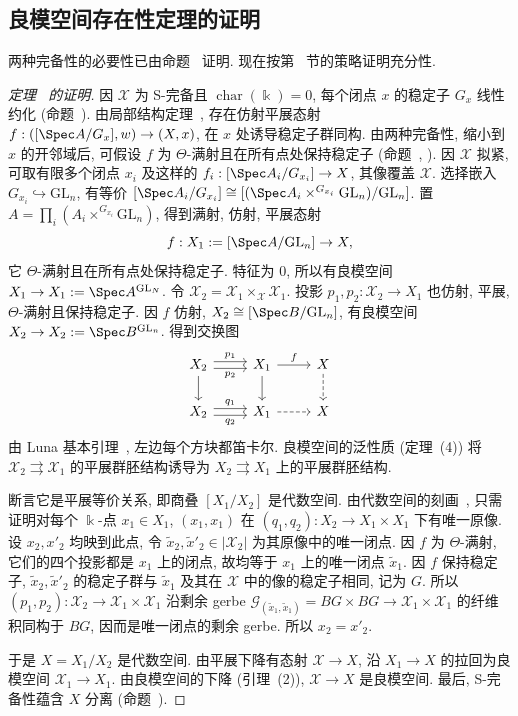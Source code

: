 \subsection{良模空间存在性定理的证明}\label{src:7.10.7-subsection}
两种完备性的必要性已由命题~ 证明. 现在按第~ 节的策略证明充分性.
\begin{proof}[定理~ 的证明]
因 $\mathcal X$ 为 S-完备且 $\operatorname{char}(\Bbbk)=0$, 每个闭点 $x$ 的稳定子 $G_x$ 线性约化 (命题~). 由局部结构定理~, 存在仿射平展态射 $f:([\Spec A/G_x],w)\to(\mathcal X,x)$, 在 $x$ 处诱导稳定子群同构. 由两种完备性, 缩小到 $x$ 的开邻域后, 可假设 $f$ 为 $\Theta$-满射且在所有点处保持稳定子 (命题~, ). 因 $\mathcal X$ 拟紧, 可取有限多个闭点 $x_i$ 及这样的 $f_i:[\Spec A_i/G_{x_i}]\to\mathcal X$, 其像覆盖 $\mathcal X$. 选择嵌入 $G_{x_i}\hookrightarrow\mathrm{GL}_n$, 有等价 $[\Spec A_i/G_{x_i}]\cong[(\Spec A_i\times^{G_{x_i}}\mathrm{GL}_n)/\mathrm{GL}_n]$. 置 $A=\prod_i(A_i\times^{G_{x_i}}\mathrm{GL}_n)$, 得到满射, 仿射, 平展态射
\[f:\mathcal X_1:=[\Spec A/\mathrm{GL}_n]\to\mathcal X,\]
它 $\Theta$-满射且在所有点处保持稳定子. 特征为 $0$, 所以有良模空间 $\mathcal X_1\to X_1:=\Spec A^{\mathrm{GL}_N}$. 令 $\mathcal X_2=\mathcal X_1\times_{\mathcal X}\mathcal X_1$. 投影 $p_1,p_2:\mathcal X_2\to X_1$ 也仿射, 平展, $\Theta$-满射且保持稳定子. 因 $f$ 仿射, $\mathcal X_2\cong[\Spec B/\mathrm{GL}_n]$, 有良模空间 $\mathcal X_2\to X_2:=\Spec B^{\mathrm{GL}_n}$. 得到交换图
\begin{align}\label{src:7.10.32}
\begin{tikzcd}[ampersand replacement=\&]\mathcal X_2\arrow[r,shift left,"{p_1}"]\arrow[r,shift right,"{p_2}"']\arrow[d]\&\mathcal X_1\arrow[r,"{f}"]\arrow[d]\&\mathcal X\arrow[d,dashed]\\X_2\arrow[r,shift left,"{q_1}"]\arrow[r,shift right,"{q_2}"']\&X_1\arrow[r,dashed]\&X\end{tikzcd}
\end{align}
由 Luna 基本引理~, 左边每个方块都笛卡尔. 良模空间的泛性质 (定理~(4)) 将 $\mathcal X_2\rightrightarrows\mathcal X_1$ 的平展群胚结构诱导为 $X_2\rightrightarrows X_1$ 上的平展群胚结构.

断言它是平展等价关系, 即商叠 $[X_1/X_2]$ 是代数空间. 由代数空间的刻画~, 只需证明对每个 $\Bbbk$-点 $x_1\in X_1$, $(x_1,x_1)$ 在 $(q_1,q_2):X_2\to X_1\times X_1$ 下有唯一原像. 设 $x_2,x'_2$ 均映到此点, 令 $\widetilde x_2,\widetilde x'_2\in|\mathcal X_2|$ 为其原像中的唯一闭点. 因 $f$ 为 $\Theta$-满射, 它们的四个投影都是 $x_1$ 上的闭点, 故均等于 $x_1$ 上的唯一闭点 $\widetilde x_1$. 因 $f$ 保持稳定子, $\widetilde x_2,\widetilde x'_2$ 的稳定子群与 $\widetilde x_1$ 及其在 $\mathcal X$ 中的像的稳定子相同, 记为 $G$. 所以 $(p_1,p_2):\mathcal X_2\to\mathcal X_1\times\mathcal X_1$ 沿剩余 gerbe $\mathcal G_{(\widetilde x_1,\widetilde x_1)}=BG\times BG\to\mathcal X_1\times\mathcal X_1$ 的纤维积同构于 $BG$, 因而是唯一闭点的剩余 gerbe. 所以 $x_2=x'_2$.

于是 $X=X_1/X_2$ 是代数空间. 由平展下降有态射 $\mathcal X\to X$, 沿 $X_1\to X$ 的拉回为良模空间 $\mathcal X_1\to X_1$. 由良模空间的下降 (引理~(2)), $\mathcal X\to X$ 是良模空间. 最后, S-完备性蕴含 $X$ 分离 (命题~).
\end{proof}
